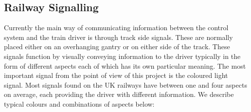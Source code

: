 \begin{comment}
A point is a physical piece of equipment that is used to 
form a junction. Due to the nature of the rails and trains it is not possible to physically
to just join two segments of track. Instead a point is needed to act as
physical switch controlling the flow of trains through a junction. A point
has two positions which are referred to as \textbf{normal} and
\textbf{reverse}. This presents a safety hazard, for example see figure \ref{fig:track}, if a train enters
the junction $B$ from $C$ when the junction is locked in the
position for normal then the train will be derailed. 
\end{comment}


\subsection{Railway Signalling}
Currently the main way of communicating information between the control system and the train driver is through track side signals. These are normally placed either on an overhanging gantry or on either side of the track. These signals function by visually conveying information to the driver typically in the form of different  aspects each of which has its own particular meaning. The most important signal from the point of view of this project is the coloured light signal. Most signals found on the UK railways have between one and four aspects on average, each providing the driver with different information. We describe typical colours and combinations of aspects below:

\begin{comment}
Signals are the main means used to communicate information regarding the state
of the track ahead of the train. Typically they are placed either on the track
side or over hanging the railway. Visual indications known as aspects are used
to convey information to the driver. A signal will have many such aspects
which can be displayed, each with a particular meaning. The main type of signal
considered in this project is the coloured light signal. Typically these have
between one - four aspects each conveying a different indication about the state of
the track ahead. Below is a description of the
aspects used for a three light signal.  
\end{comment}



